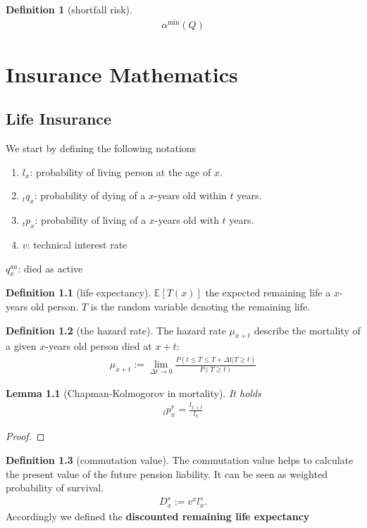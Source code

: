 \documentclass[a4paper,11pt]{book}
\newtheorem{lemma}[theorem]{Lemma}
\theoremstyle{definition}
\newtheorem{definition}{Definition}[section]
\theoremstyle{remark}
\begin{document}
\begin{definition}[shortfall risk]
\begin{align*}
	\alpha^{\min}(Q)
\end{align*}
\end{definition}


\chapter{Insurance Mathematics}
\section{Life Insurance}
We start by defining the following notations
\begin{enumerate}
	\item $l_x$: probability of living person at the age of $x$.
	\item ${}_t q_x$: probability of dying of a $x$-years old within $t$ years.
	\item ${}_t p_x$: probability of living of a $x$-years old with $t$ years. 
	\item $v$: technical interest rate
\end{enumerate}

$q^{aa}_x$: died as active

\begin{definition}[life expectancy]
	$\mathbb{E}[T(x)]$ the expected remaining life a $x$-years old person. $T$ is the random variable denoting the remaining life. 
\end{definition}

\begin{definition}[the hazard rate]
	The hazard rate $\mu_{x + t}$ describe the mortality of a given $x$-years old person died at $x + t$:
	\begin{align*}
		\mu_{x + t}:= \lim_{\Delta t \rightarrow 0} \frac{P(t \le T \le T + \Delta t|T \ge t) }{P(T \ge t) }
	\end{align*}
\end{definition}

\begin{lemma}[Chapman-Kolmogorov in mortality]
It holds
\begin{align*}
	{}_tp_x^r = \frac{l_{x + t}}{l_x}
\end{align*}
\end{lemma}
\begin{proof}
\end{proof}

\begin{definition}[commutation value]
The commutation value helps to calculate the present value of the future pension liability. It can be seen as weighted probability of survival.
\begin{align*}
	D_x^s := v^x l_x^s.
\end{align*}
Accordingly we defined the \textbf{discounted remaining life expectancy}
\end{definition}
\end{document}
